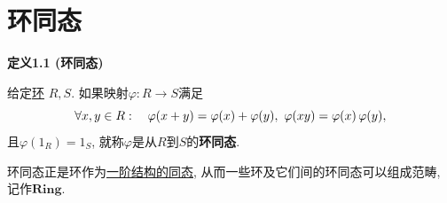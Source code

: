 \documentclass[UTF8]{ctexart}
\begin{document}
\setlength{\abovedisplayskip}{1pt}
\setlength{\belowdisplayskip}{1pt}

\section{环同态}

\hypertarget{sec:定义1.1}{}
\noindent\textbf{定义1.1 (环同态)}

给定\href{01 环与子环#nameddest=sec:定义1.1}{环} $R,S$.
如果映射$\varphi:R\to S$满足
\[
    \forall x,y\in R:\quad\varphi(x+y)=\varphi(x)+\varphi(y),\,\,
    \varphi(xy)=\varphi(x)\,\varphi(y),\\[1pt]
\]
且$\varphi(1_R)=1_S$, 就称$\varphi$是从$R$到$S$的\textbf{环同态}.

\vspace{10pt}

环同态正是环作为\href{../../../06 数理逻辑/01 一阶逻辑/02 一阶模型论/01 一阶语言的结构/02 结构的同态#nameddest=sec:定义1.1}
{一阶结构的同态}, 从而一些环及它们间的环同态可以组成范畴, 记作$\mathbf{Ring}$.
\end{document}
